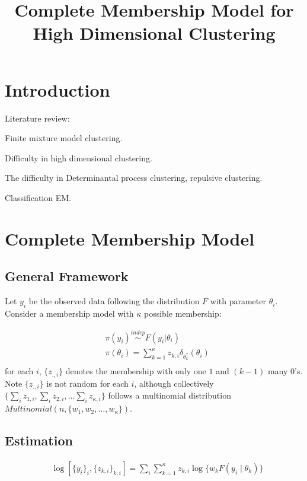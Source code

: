 \documentclass[12pt]{article}
\title
    {Complete Membership Model for High Dimensional Clustering}
\date{}
\begin{document}
    
\maketitle

\section{Introduction}

Literature review:

Finite mixture model clustering.

Difficulty in high dimensional clustering.

The difficulty in Determinantal process clustering, repulsive clustering.

Classification EM.

\section{Complete Membership Model}

\subsection{General Framework}

Let $y_i$ be the observed data following the distribution $F$ with parameter $\theta_i$. Consider a  membership model with $\kappa$ possible membership:

\begin{equation}
\begin{aligned}
& \pi(y_i) \stackrel{indep}{\sim} F(y_i|\theta_i) \\
& \pi(\theta_i) = \sum_{k=1}^{\kappa} z_{k,i} \delta_{\theta^*_{k}}(\theta_i) \\
\end{aligned}
\label{membership_model}
\end{equation}
for each $i$, $\{ z_{.,i}\}$ denotes the membership with only one $1$ and $(k-1)$ many $0$'s. Note $\{ z_{.,i}\}$ is not random for each $i$, although collectively $\{ \sum_i  z_{1,i}, \sum_i  z_{2,i},\ldots \sum_i  z_{\kappa,i} \}$ follows a multinomial distribution $Multinomial(n, \{ w_1, w_2, \ldots, w_\kappa \})$.
 
\subsection{Estimation}

\begin{equation}
\begin{aligned}
& \log[ \{y_i\}_i, \{z_{k,i}\}_{k,i} ] =  \sum_{i}\sum_{k=1}^{\kappa} z_{k,i} \log \{w_k F(y_i\mid \theta_k)  \}
\end{aligned}
\label{conditional_lik}
\end{equation}
\end{document}

